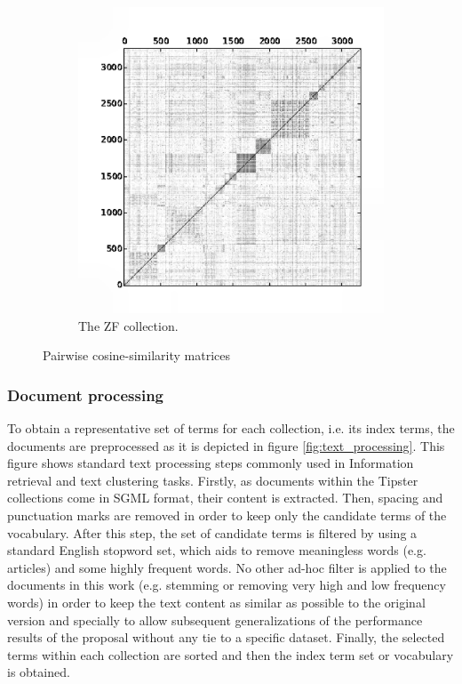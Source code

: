 \documentclass[a4paper]{article}
\begin{document}
\begin{figure}[!htbp]
    \begin{subfigure}[b]{0.3\textwidth}
        \includegraphics[width=\textwidth]{./similarities/ZF-simcos}
        \caption{The ZF collection.}
        \label{fig:zf_sim}
    \end{subfigure}    
    \caption{Pairwise cosine-similarity matrices}\label{fig:sim_matrices}
\end{figure}

\subsubsection*{Document processing}
To obtain a representative set of terms for each collection, i.e. its index terms, the documents are preprocessed as it is depicted in figure \ref{fig:text_processing}. This figure shows  standard text processing steps commonly used in Information retrieval and text clustering tasks. Firstly, as documents within the Tipster collections come in SGML format, their content is extracted. Then, spacing and punctuation marks are removed in order to keep only the candidate terms of the vocabulary. After this step, the set of candidate terms is filtered by using a standard English stopword set, which aids to remove meaningless words (e.g. articles) and some highly frequent words. No other ad-hoc filter is applied to the documents in this work (e.g. stemming or removing very high and low frequency words) in order to keep the text content as similar as possible to the original version and specially to allow subsequent generalizations of the performance results of the proposal without any tie to a specific dataset. Finally, the selected terms within each collection are sorted and then the index term set or vocabulary is obtained.
\end{document}
